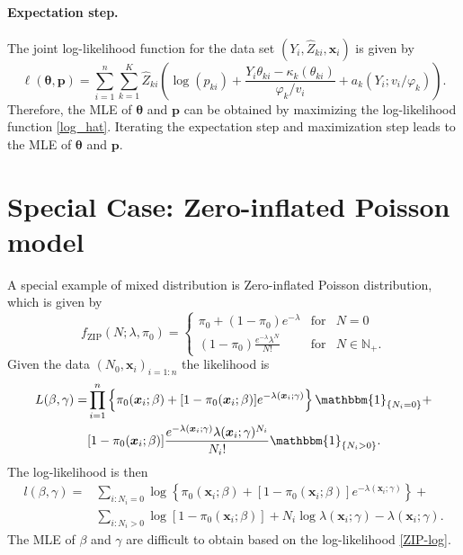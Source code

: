 \documentclass[11pt]{article}
\numberwithin{equation}{section}
\def\N{{\mathbb N}}  %
\def\bx{\boldsymbol{x}}
\begin{document}
\paragraph{Expectation step.} The joint log-likelihood function for the data set $(Y_i,\hat{Z}_{ki},\bx_i)$ is given by 
\begin{equation}
	\ell(\boldsymbol{\theta},\boldsymbol{p})=\sum_{i=1}^n \sum_{k=1}^{K} \hat{Z}_{ki}\left(\log \left(p_{ki}\right)+\frac{Y_i \theta_{ki}-\kappa_{k}\left(\theta_{ki}\right)}{\varphi_{k} / v_i}+a_{k}\left(Y_i ; v_i / \varphi_{k}\right)\right).
	\label{log_hat}
\end{equation}
Therefore, the MLE of $\boldsymbol{\theta}$ and $\boldsymbol{p}$ can be obtained by maximizing the log-likelihood function \eqref{log_hat}. Iterating the expectation step and maximization step leads to the MLE of $\boldsymbol{\theta}$ and $\boldsymbol{p}$.

\section{Special Case: Zero-inflated Poisson model}
A special example of mixed distribution is Zero-inflated Poisson distribution, which is given by 
\begin{equation}
	f_{\text{ZIP}}(N;\lambda,\pi_0) = \left\{ 
	\begin{array}{ccl}
		\pi_0+(1-\pi_0)e^{-\lambda} & \mbox{for}
		& N=0 \\
		(1-\pi_0)\frac{e^{-\lambda}\lambda^N}{N!} & \mbox{for} &N\in\N_+.
	\end{array}\right.
\end{equation}
Given the data $(N_0,\bx_i)_{i=1:n}$ the likelihood is
\begin{equation}\label{ZIP}
	\begin{aligned}
		L(\beta,\gamma)=&\prod_{i=1}^{n}\left\{\pi_0(\bx_i;\beta)+[1-\pi_0(\bx_i;\beta)]e^{-\lambda(\bx_i;\gamma)}\right\}\mathbbm{1}_{\{N_i=0\}}+ \\
		&[1-\pi_0(\bx_i;\beta)]\frac{e^{-\lambda(\bx_i;\gamma)}\lambda(\bx_i;\gamma)^{N_i}}{N_i!}\mathbbm{1}_{\{N_i>0\}}.
	\end{aligned}
\end{equation}
The log-likelihood is then
\begin{equation}\label{ZIP-log}
	\begin{aligned}
		l(\beta,\gamma)=&\sum_{i:N_i=0}\log\left\{\pi_0(\bx_i;\beta)+[1-\pi_0(\bx_i;\beta)]e^{-\lambda(\bx_i;\gamma)}\right\}+ \\
		&\sum_{i:N_i>0}\log[1-\pi_0(\bx_i;\beta)]+N_i\log \lambda(\bx_i;\gamma)-\lambda(\bx_i;\gamma).
	\end{aligned}
\end{equation} 
The MLE of $\beta$ and $\gamma$ are difficult to obtain based on the log-likelihood \eqref{ZIP-log}.  
\end{document}
